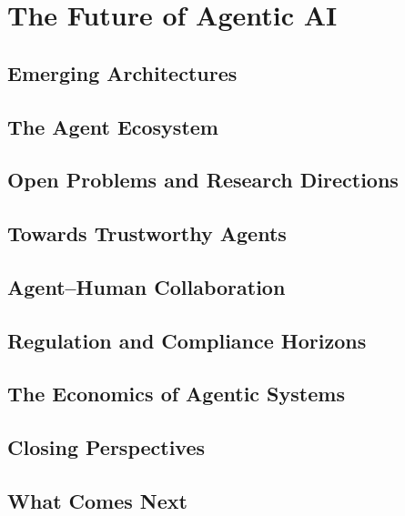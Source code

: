\part{The Future of Agentic AI}
\label{part:future}

\chapter{Emerging Architectures}\label{ch:emerging-architectures}


\chapter{The Agent Ecosystem}\label{ch:agent-ecosystem}


\chapter{Open Problems and Research Directions}\label{ch:open-problems}


\chapter{Towards Trustworthy Agents}\label{ch:trustworthy-agents}


\chapter{Agent--Human Collaboration}\label{ch:agent-human-collaboration}


\chapter{Regulation and Compliance Horizons}\label{ch:regulation-compliance}


\chapter{The Economics of Agentic Systems}\label{ch:economics}


\chapter{Closing Perspectives}\label{ch:closing-perspectives}


\chapter{What Comes Next}\label{ch:what-comes-next}


\backmatter

\printindex


